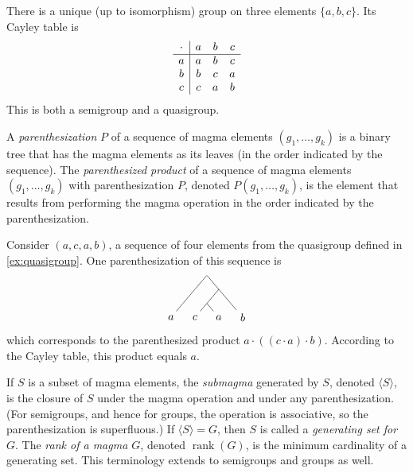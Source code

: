 \documentclass{article}
\newcommand{\gen}[1]{\langle #1 \rangle}
\DeclareMathOperator{\rank}{rank}
\begin{document}
\begin{example}
  There is a unique (up to isomorphism) group on three elements $\{a, b, c\}$.
  Its Cayley table is
  \begin{equation*}
    \begin{array}{c | c c c}
      \cdot & a & b & c \\
      \hline
      a & a & b & c \\
      b & b & c & a \\
      c & c & a & b \\
    \end{array}
  \end{equation*}
  This is both a semigroup and a quasigroup.
\end{example}

A \emph{parenthesization} $P$ of a sequence of magma elements $(g_1, \dotsc, g_k)$ is a binary tree that has the magma elements as its leaves (in the order indicated by the sequence).
The \emph{parenthesized product} of a sequence of magma elements $(g_1, \dotsc, g_k)$ with parenthesization $P$, denoted $P(g_1, \dotsc, g_k)$, is the element that results from performing the magma operation in the order indicated by the parenthesization.

\begin{example}
  Consider $(a, c, a, b)$, a sequence of four elements from the quasigroup defined in \autoref{ex:quasigroup}.
  One parenthesization of this sequence is
  \begin{equation*}
    \begin{tikzpicture}[xscale=0.5, yscale=0.3]
      \node[minimum size=0pt, inner sep=0pt] {}
      child {
        child {
          child {node {$a$}}
          child[color=white] {}
        }
        child[color=white] {}
      }
      child {
        child {
          child {node {$c$}}
          child {node {$a$}}
        }
        child {
          child[color=white] {}
          child {node {$b$}}
        }
      };
    \end{tikzpicture}
  \end{equation*}
  which corresponds to the parenthesized product $a \cdot ((c \cdot a) \cdot b)$.
  According to the Cayley table, this product equals $a$.
\end{example}

If $S$ is a subset of magma elements, the \emph{submagma} generated by $S$, denoted $\gen{S}$, is the closure of $S$ under the magma operation and under any parenthesization.
(For semigroups, and hence for groups, the operation is associative, so the parenthesization is superfluous.)
If $\gen{S} = G$, then $S$ is called a \emph{generating set for $G$}.
The \emph{rank of a magma $G$}, denoted $\rank(G)$, is the minimum cardinality of a generating set.
This terminology extends to semigroups and groups as well.
\end{document}
